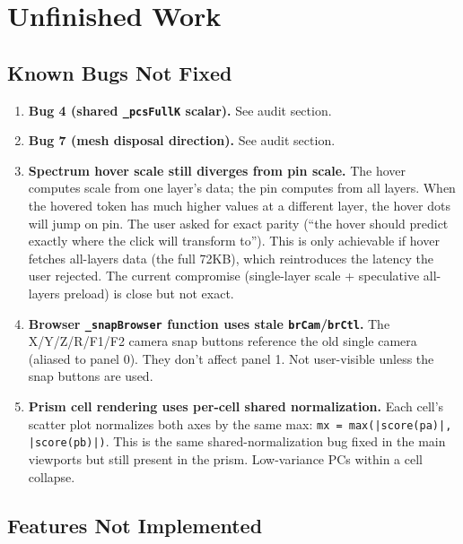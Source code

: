 \documentclass[11pt,a4paper]{article}
\begin{document}
\section{Unfinished Work}

\subsection{Known Bugs Not Fixed}

\begin{enumerate}
  \item \textbf{Bug 4 (shared \texttt{\_pcsFullK} scalar).} See audit section.
  \item \textbf{Bug 7 (mesh disposal direction).} See audit section.
  \item \textbf{Spectrum hover scale still diverges from pin scale.} The hover computes scale from one layer's data; the pin computes from all layers. When the hovered token has much higher values at a different layer, the hover dots will jump on pin. The user asked for exact parity (``the hover should predict exactly where the click will transform to''). This is only achievable if hover fetches all-layers data (the full 72KB), which reintroduces the latency the user rejected. The current compromise (single-layer scale + speculative all-layers preload) is close but not exact.
  \item \textbf{Browser \texttt{\_snapBrowser} function uses stale \texttt{brCam}/\texttt{brCtl}.} The X/Y/Z/R/F1/F2 camera snap buttons reference the old single camera (aliased to panel 0). They don't affect panel 1. Not user-visible unless the snap buttons are used.
  \item \textbf{Prism cell rendering uses per-cell shared normalization.} Each cell's scatter plot normalizes both axes by the same max: \texttt{mx = max(|score(pa)|, |score(pb)|)}. This is the same shared-normalization bug fixed in the main viewports but still present in the prism. Low-variance PCs within a cell collapse.
\end{enumerate}

\subsection{Features Not Implemented}
\end{document}
